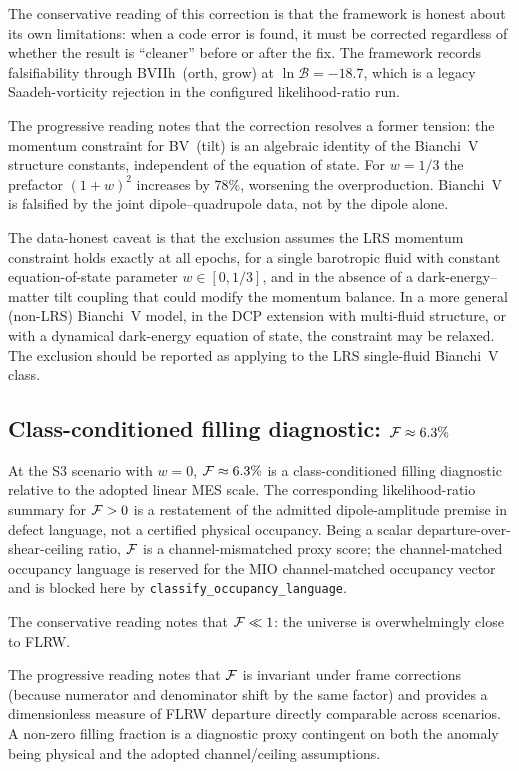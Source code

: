The conservative reading of this correction is that the framework
is honest about its own limitations: when a code error is found,
it must be corrected regardless of whether the result is
``cleaner'' before or after the fix.  The framework records
falsifiability through BVIIh~(orth, grow) at
$\ln\mathcal{B} = -18.7$, which is a legacy Saadeh-vorticity
rejection in the configured likelihood-ratio run.

The progressive reading notes that the correction resolves a
former tension: the momentum constraint for BV~(tilt) is an
algebraic identity of the Bianchi~V structure constants,
independent of the equation of state.  For $w = 1/3$ the
prefactor $(1+w)^2$ increases by $78\%$, worsening the
overproduction.  Bianchi~V is falsified by the joint
dipole--quadrupole data, not by the dipole alone.

The data-honest caveat is that the exclusion assumes the LRS
momentum constraint holds exactly at all epochs, for a
single barotropic fluid with constant equation-of-state
parameter $w \in [0, 1/3]$, and in the absence of a
dark-energy--matter tilt coupling that could modify the
momentum balance.  In a more general (non-LRS) Bianchi~V
model, in the DCP extension with multi-fluid structure, or
with a dynamical dark-energy equation of state, the constraint
may be relaxed.  The exclusion should be reported as applying
to the LRS single-fluid Bianchi~V class.


\subsection{Class-conditioned filling diagnostic: $\mathcal{F} \approx 6.3\%$}

At the S3 scenario with $w = 0$, $\mathcal{F} \approx 6.3\%$ is a
class-conditioned filling diagnostic relative to the adopted
linear MES scale.  The corresponding likelihood-ratio summary
for $\mathcal{F} > 0$ is a restatement of the admitted dipole-amplitude
premise in defect language, not a certified physical occupancy.
Being a scalar departure-over-shear-ceiling ratio, $\mathcal{F}$ is a
channel-mismatched proxy score; the channel-matched occupancy
language is reserved for the MIO channel-matched occupancy vector
and is blocked here by \texttt{classify\_occupancy\_language}.

The conservative reading notes that $\mathcal{F} \ll 1$: the universe
is overwhelmingly close to FLRW.

The progressive reading notes that $\mathcal{F}$ is invariant under
frame corrections (because numerator and denominator shift by
the same factor) and provides a dimensionless measure of FLRW
departure directly comparable across scenarios.  A non-zero
filling fraction is a diagnostic proxy contingent on both the
anomaly being physical and the adopted channel/ceiling
assumptions.


